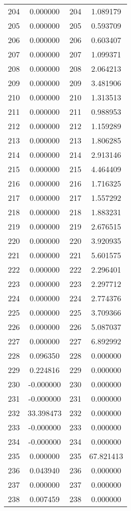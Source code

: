 \documentclass[12pt]{article}
\begin{document}
\begin{longtable}{@{}cccc@{}}
204 & 0.000000 & 204 & 1.089179 \\
205 & 0.000000 & 205 & 0.593709 \\
206 & 0.000000 & 206 & 0.603407 \\
207 & 0.000000 & 207 & 1.099371 \\
208 & 0.000000 & 208 & 2.064213 \\
209 & 0.000000 & 209 & 3.481906 \\
210 & 0.000000 & 210 & 1.313513 \\
211 & 0.000000 & 211 & 0.988953 \\
212 & 0.000000 & 212 & 1.159289 \\
213 & 0.000000 & 213 & 1.806285 \\
214 & 0.000000 & 214 & 2.913146 \\
215 & 0.000000 & 215 & 4.464409 \\
216 & 0.000000 & 216 & 1.716325 \\
217 & 0.000000 & 217 & 1.557292 \\
218 & 0.000000 & 218 & 1.883231 \\
219 & 0.000000 & 219 & 2.676515 \\
220 & 0.000000 & 220 & 3.920935 \\
221 & 0.000000 & 221 & 5.601575 \\
222 & 0.000000 & 222 & 2.296401 \\
223 & 0.000000 & 223 & 2.297712 \\
224 & 0.000000 & 224 & 2.774376 \\
225 & 0.000000 & 225 & 3.709366 \\
226 & 0.000000 & 226 & 5.087037 \\
227 & 0.000000 & 227 & 6.892992 \\
228 & 0.096350 & 228 & 0.000000 \\
229 & 0.224816 & 229 & 0.000000 \\
230 & -0.000000 & 230 & 0.000000 \\
231 & -0.000000 & 231 & 0.000000 \\
232 & 33.398473 & 232 & 0.000000 \\
233 & -0.000000 & 233 & 0.000000 \\
234 & -0.000000 & 234 & 0.000000 \\
235 & 0.000000 & 235 & 67.821413 \\
236 & 0.043940 & 236 & 0.000000 \\
237 & 0.000000 & 237 & 0.000000 \\
238 & 0.007459 & 238 & 0.000000 \\

\end{longtable}
\end{document}
